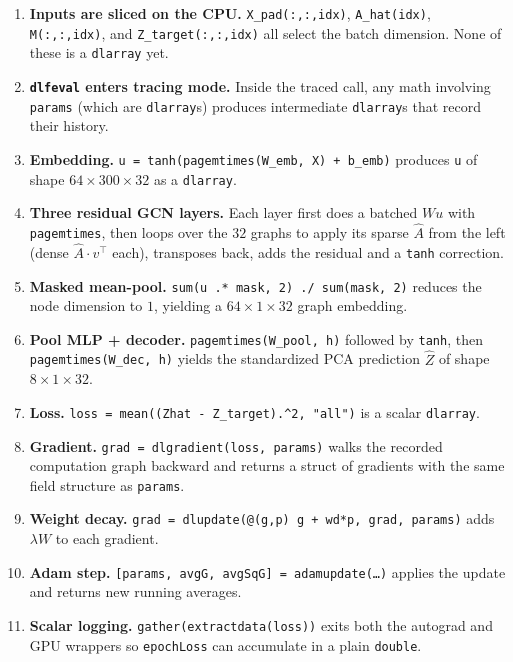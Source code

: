 \documentclass[11pt]{article}
\begin{document}
\begin{enumerate}[leftmargin=1.4em]
  \item \textbf{Inputs are sliced on the CPU.}
        \texttt{X\_pad(:,:,idx)}, \texttt{A\_hat(idx)},
        \texttt{M(:,:,idx)}, and \texttt{Z\_target(:,:,idx)} all select the
        batch dimension. None of these is a \texttt{dlarray} yet.
  \item \textbf{\texttt{dlfeval} enters tracing mode.}
        Inside the traced call, any math involving \texttt{params} (which
        are \texttt{dlarray}s) produces intermediate \texttt{dlarray}s that
        record their history.
  \item \textbf{Embedding.}
        \texttt{u = tanh(pagemtimes(W\_emb, X) + b\_emb)}
        produces \texttt{u} of shape $64\times 300\times 32$ as a
        \texttt{dlarray}.
  \item \textbf{Three residual GCN layers.}
        Each layer first does a batched $Wu$ with \texttt{pagemtimes}, then
        loops over the $32$ graphs to apply its sparse $\hat A$ from the
        left (dense $\hat A\cdot v^{\!\top}$ each), transposes back, adds
        the residual and a \texttt{tanh} correction.
  \item \textbf{Masked mean-pool.}
        \texttt{sum(u .* mask, 2) ./ sum(mask, 2)} reduces the node
        dimension to $1$, yielding a $64\times 1\times 32$ graph
        embedding.
  \item \textbf{Pool MLP + decoder.}
        \texttt{pagemtimes(W\_pool, h)} followed by \texttt{tanh}, then
        \texttt{pagemtimes(W\_dec, h)} yields the standardized PCA
        prediction $\widehat Z$ of shape $8\times 1\times 32$.
  \item \textbf{Loss.}
        \texttt{loss = mean((Zhat - Z\_target).\^{}2, "all")} is a
        scalar \texttt{dlarray}.
  \item \textbf{Gradient.}
        \texttt{grad = dlgradient(loss, params)} walks the recorded
        computation graph backward and returns a struct of gradients with
        the same field structure as \texttt{params}.
  \item \textbf{Weight decay.}
        \texttt{grad = dlupdate(@(g,p) g + wd*p, grad, params)} adds
        $\lambda W$ to each gradient.
  \item \textbf{Adam step.}
        \texttt{[params, avgG, avgSqG] = adamupdate(\ldots)} applies the
        update and returns new running averages.
  \item \textbf{Scalar logging.}
        \texttt{gather(extractdata(loss))} exits both the autograd and GPU
        wrappers so \texttt{epochLoss} can accumulate in a plain
        \texttt{double}.
\end{enumerate}
\end{document}
